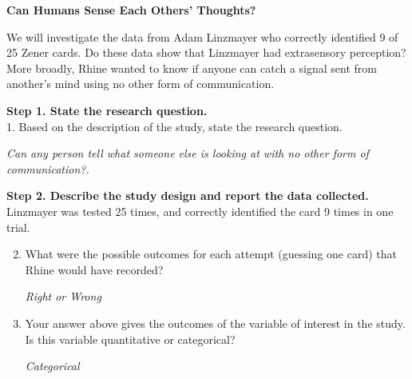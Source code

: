 \def\theTopic{ESP}
\def\dayNum{5}
\begin{center}
{\bf {\large Can Humans Sense Each Others' Thoughts?}}\\
\vspace{-.1in}
\end{center}

  We will investigate the data from Adam Linzmayer who correctly
  identified 9 of 25 Zener cards.  Do these data show that
  Linzmayer had extrasensory perception?  More broadly, Rhine wanted
  to know if anyone can catch a signal sent from another's mind using
  no other form of communication.

{\bf Step 1. State the research question. }\\
1. Based on the description of the study, state the research question.
\begin{students}
  \vspace{2cm}
\end{students}

\begin{key}
{\it  Can any person tell what someone else is looking at with no
  other form of communication?.}
\end{key}



{\bf Step 2. Describe the study design and report the data collected.}\\
 Linzmayer was tested 25 times, and correctly identified the card 9
 times in one trial.\vspace{-.3cm}
 \begin{enumerate}
   \setcounter{enumi}{1}
   \item  What were the possible outcomes for each attempt (guessing one card)
     that Rhine would have recorded?
\begin{students}
  \vspace{1cm}
\end{students}

\begin{key}
{\it Right or Wrong}
\end{key}

\item Your answer above gives the outcomes of the variable of interest
  in the study.  Is this variable quantitative or categorical?
\begin{students}
  \vspace{1cm}
\end{students}

\begin{key}
{\it Categorical}
\end{key}
  
   \end{enumerate}
   
